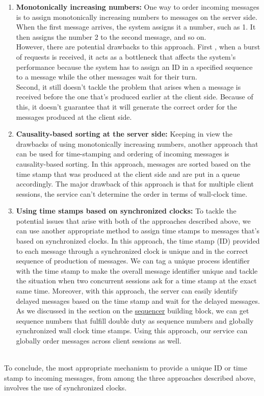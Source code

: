 \begin{enumerate}
\item
\protect{}\label{7ZC98ODLFRoZaj7OL63yM}
\textbf{Monotonically increasing numbers:} One way to order incoming messages is to assign monotonically increasing numbers to messages on the server side. When the first message arrives, the system assigns it a number, such as 1. It then assigns the number 2 to the second message, and so on.\\
However, there are potential drawbacks to this approach. First , when a burst of requests is received, it acts as a bottleneck that affects the system's performance because the system has to assign an ID in a specified sequence to a message while the other messages wait for their turn.\\
Second, it still doesn't tackle the problem that arises when a message is received before the one that's produced earlier at the client side. Because of this, it doesn't guarantee that it will generate the correct order for the messages produced at the client side.
\item
\protect{}\label{gAeco2jyusyxo8OYN6iNX}
\textbf{Causality-based sorting at the server side:} Keeping in view the drawbacks of using monotonically increasing numbers, another approach that can be used for time-stamping and ordering of incoming messages is causality-based sorting. In this approach, messages are sorted based on the time stamp that was produced at the client side and are put in a queue accordingly. The major drawback of this approach is that for multiple client sessions, the service can't determine the order in terms of wall-clock time.
\item
\protect{}\label{_ZXJ_-nTM59BSBPZlC3xW}
\textbf{Using time stamps based on synchronized clocks:} To tackle the potential issues that arise with both of the approaches described above, we can use another appropriate method to assign time stamps to messages that's based on synchronized clocks. In this approach, the time stamp (ID) provided to each message through a synchronized clock is unique and in the correct sequence of production of messages. We can tag a unique process identifier with the time stamp to make the overall message identifier unique and tackle the situation when two concurrent sessions ask for a time stamp at the exact same time. Moreover, with this approach, the server can easily identify delayed messages based on the time stamp and wait for the delayed messages.\\
As we discussed in the section on the \href{https://www.educative.io/courses/grokking-the-system-design-interview/system-design-sequencer}{sequencer} building block, we can get sequence numbers that fulfill double duty as sequence numbers and globally synchronized wall clock time stamps. Using this approach, our service can globally order messages across client sessions as well.
\end{enumerate}
\\
To conclude, the most appropriate mechanism to provide a unique ID or time stamp to incoming messages, from among the three approaches described above, involves the use of synchronized clocks.
\\
